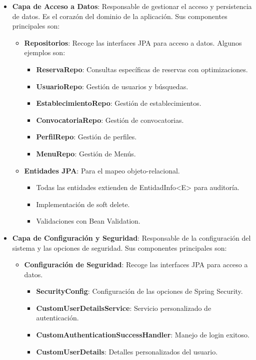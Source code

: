 \begin{itemize}
	\item \textbf{Capa de Acceso a Datos}: Responsable de gestionar el acceso y persistencia de datos. Es el corazón del dominio de la aplicación. Sus componentes principales son:
    	\begin{itemize}
            \item \textbf{Repositorios}: Recoge las interfaces JPA para acceso a datos. Algunos ejemplos son:
        	\begin{itemize}
                \item \textbf{ReservaRepo}: Consultas específicas de reservas con optimizaciones.
                \item \textbf{UsuarioRepo}: Gestión de usuarios y búsquedas.
                \item \textbf{EstablecimientoRepo}: Gestión de establecimientos.
                \item \textbf{ConvocatoriaRepo}: Gestión de convocatorias.
                \item \textbf{PerfilRepo}: Gestión de perfiles.
                \item \textbf{MenuRepo}: Gestión de Menús.
             \end{itemize}

            \item \textbf{Entidades JPA}: Para el mapeo objeto-relacional.
        	\begin{itemize}
                \item Todas las entidades extienden de EntidadInfo<E> para auditoría.
                \item Implementación de soft delete.
                \item Validaciones con Bean Validation.
             \end{itemize}
         \end{itemize}

	\item \textbf{Capa de Configuración y Seguridad}: Responsable de la configuración del sistema y las opciones de seguridad. Sus componentes principales son:
    	\begin{itemize}
            \item \textbf{Configuración de Seguridad}: Recoge las interfaces JPA para acceso a datos.
        	\begin{itemize}
                \item \textbf{SecurityConfig}: Configuración de las opciones de Spring Security.
                \item \textbf{CustomUserDetailsService}: Servicio personalizado de autenticación.
                \item \textbf{CustomAuthenticationSuccessHandler}: Manejo de login exitoso.
                \item \textbf{CustomUserDetails}: Detalles personalizados del usuario.
             \end{itemize}


\end{itemize}
\end{itemize}
